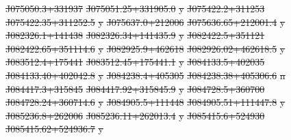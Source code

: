 \documentclass[11pt, a4paper]{book}
\providecommand{\DIFdeltex}[1]{{\protect\color{red}\sout{#1}}}                      %
\providecommand{\DIFdelFL}[1]{\DIFdel{#1}} %
\providecommand{\DIFdel}[1]{\texorpdfstring{\DIFdeltex{#1}}{}} %
\begin{document}
\DIFdelFL{J075050.3+331937 }%
\DIFdelFL{J075051.25+331905.0 }%
\DIFdelFL{y}%
\DIFdelFL{J075422.2+311253 }%
\DIFdelFL{J075422.35+311252.5 }%
\DIFdelFL{y}%
\DIFdelFL{J075637.0+212006 }%
\DIFdelFL{J075636.65+212001.4 }%
\DIFdelFL{y}%
\DIFdelFL{J082326.1+141438 }%
\DIFdelFL{J082326.34+141435.9 }%
\DIFdelFL{y}%
\DIFdelFL{J082422.5+351121 }%
\DIFdelFL{J082422.65+351114.6 }%
\DIFdelFL{y}%
\DIFdelFL{J082925.9+462618 }%
\DIFdelFL{J082926.02+462618.5 }%
\DIFdelFL{y}%
\DIFdelFL{J083512.4+175441 }%
\DIFdelFL{J083512.45+175441.1 }%
\DIFdelFL{y}%
\DIFdelFL{J084133.5+402035 }%
\DIFdelFL{J084133.40+402042.8 }%
\DIFdelFL{y}%
\DIFdelFL{J084238.4+405305 }%
\DIFdelFL{J084238.38+405306.6 }%
\DIFdelFL{n}%
\DIFdelFL{J084417.3+315845 }%
\DIFdelFL{J084417.92+315845.9 }%
\DIFdelFL{y}%
\DIFdelFL{J084728.5+360700 }%
\DIFdelFL{J084728.24+360714.6 }%
\DIFdelFL{y}%
\DIFdelFL{J084905.5+111448 }%
\DIFdelFL{J084905.51+111447.8 }%
\DIFdelFL{y}%
\DIFdelFL{J085236.8+262006 }%
\DIFdelFL{J085236.11+262013.4 }%
\DIFdelFL{y}%
\DIFdelFL{J085415.6+524930 }%
\DIFdelFL{J085415.62+524936.7 }%
\DIFdelFL{y}%
\end{document}
